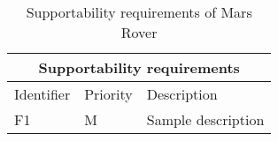 \begin{table}[H]
	\centering
	\begin{tabular}{|l|l|l|}
		\hline
		\multicolumn{3}{|c|}{Supportability requirements} \\  \hline
		\hline
		Identifier & Priority & Description \\  
		\hline
		\hline
		F1 & M & Sample description \\  
		\hline
	\end{tabular}
\caption{Supportability requirements of Mars Rover}
\label{tbl:supportabilityReq}
\end{table}